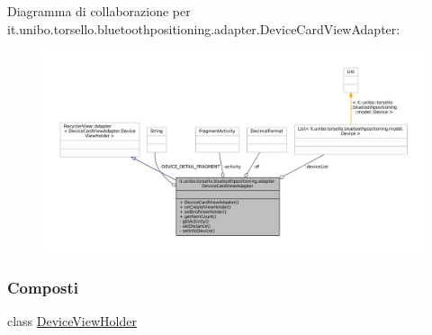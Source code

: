Diagramma di collaborazione per it.\+unibo.\+torsello.\+bluetoothpositioning.\+adapter.\+Device\+Card\+View\+Adapter\+:
\nopagebreak
\begin{figure}[H]
\begin{center}
\leavevmode
\includegraphics[width=350pt]{classit_1_1unibo_1_1torsello_1_1bluetoothpositioning_1_1adapter_1_1DeviceCardViewAdapter__coll__graph}
\end{center}
\end{figure}
\subsubsection*{Composti}
\begin{DoxyCompactItemize}
\item 
class \hyperlink{classit_1_1unibo_1_1torsello_1_1bluetoothpositioning_1_1adapter_1_1DeviceCardViewAdapter_1_1DeviceViewHolder}{Device\+View\+Holder}
\end{DoxyCompactItemize}
